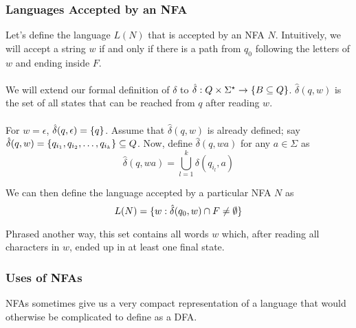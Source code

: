 \documentclass[]{article}
\DeclarePairedDelimiter{\set}{\lbrace}{\rbrace}
\theoremstyle{definition}
\begin{document}
        \subsubsection{Languages Accepted by an NFA}
          Let's define the language $L(N)$ that is accepted by an NFA $N$. Intuitively, we will accept a string $w$ if and only if there is a path from $q_0$ following the letters of $w$ and ending inside $F$.
          \\ \\
          We will extend our formal definition of $\delta$ to $\hat{\delta}: Q \times \Sigma^\star \to \set{ B \subseteq Q }$. $\hat{\delta}(q, w)$ is the set of all states that can be reached from $q$ after reading $w$.
          \\ \\
          For $w = \epsilon$, $\hat{\delta}(q, \epsilon) = \set{q}$. Assume that $\hat{\delta}(q, w)$ is already defined; say $\hat{\delta}(q, w) = \set{q_{i_1}, q_{i_2}, \ldots, q_{i_k}} \subseteq Q$. Now, define $\hat{\delta}(q, wa)$ for any $a \in \Sigma$ as
          $$
            \hat{\delta}(q, wa) = \bigcup_{l = 1}^{k} \delta(q_{i_l}, a)
          $$

          We can then define the language accepted by a particular NFA $N$ as
          $$
            L(N) = \set{ w : \hat{\delta}(q_0, w) \cap F \ne \emptyset }
          $$

          Phrased another way, this set contains all words $w$ which, after reading all characters in $w$, ended up in at least one final state.

        \subsubsection{Uses of NFAs}
          NFAs sometimes give us a very compact representation of a language that would otherwise be complicated to define as a DFA.
\end{document}
